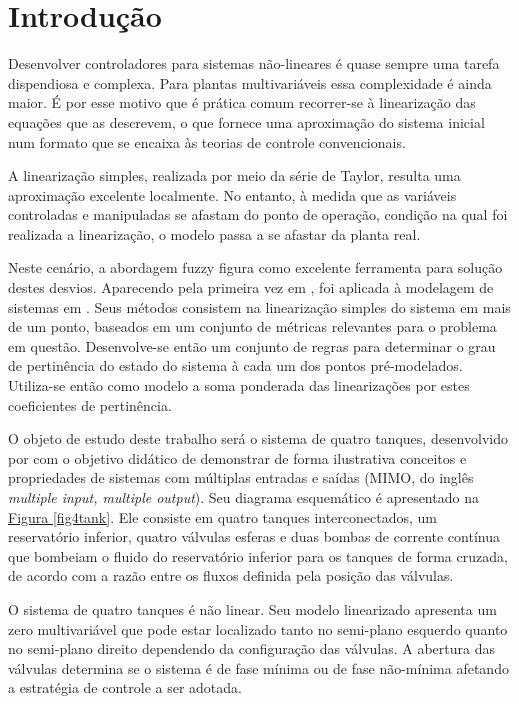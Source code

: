 %

\chapter{Introdução}

\indent Desenvolver controladores para sistemas não-lineares é quase sempre uma tarefa dispendiosa e complexa. Para plantas multivariáveis essa complexidade é ainda maior. É por esse motivo que é prática comum recorrer-se à linearização das equações que as descrevem, o que fornece uma aproximação do sistema inicial num formato que se encaixa às teorias de controle convencionais.

A linearização simples, realizada por meio da série de Taylor, resulta uma aproximação excelente localmente. No entanto, à medida que as variáveis controladas e manipuladas se afastam do ponto de operação, condição na qual foi realizada a linearização, o modelo passa a se afastar da planta real.

Neste cenário, a abordagem fuzzy figura como excelente ferramenta para solução destes desvios. Aparecendo pela primeira vez em \cite{zadeh65}, foi aplicada à modelagem de sistemas em \cite{takagi_sugeno}. Seus métodos consistem na linearização simples do sistema em mais de um ponto, baseados em um conjunto de métricas relevantes para o problema em questão. Desenvolve-se então um conjunto de regras para determinar o grau de pertinência do estado do sistema à cada um dos pontos pré-modelados. Utiliza-se então como modelo a soma ponderada das linearizações por estes coeficientes de pertinência. 

O objeto de estudo deste trabalho será o sistema de quatro tanques, desenvolvido por \cite{johansson2} com o objetivo didático de demonstrar de forma ilustrativa conceitos e propriedades de sistemas com múltiplas entradas e saídas (MIMO, do inglês \textit{multiple input, multiple output}). Seu diagrama esquemático é apresentado na  \hyperref[fig4tank]{Figura \ref{fig4tank}}. Ele consiste em quatro tanques interconectados, um reservatório inferior, quatro válvulas esferas e duas bombas de corrente contínua que bombeiam o fluido do reservatório inferior para os tanques de forma cruzada, de acordo com a razão entre os fluxos definida pela posição das válvulas.

O sistema de quatro tanques é não linear. Seu modelo linearizado apresenta um zero multivariável que pode estar localizado tanto no semi-plano esquerdo quanto no semi-plano direito dependendo da configuração das válvulas. A abertura das válvulas determina se o sistema é de fase mínima ou de fase não-mínima afetando a estratégia de controle a ser adotada.

